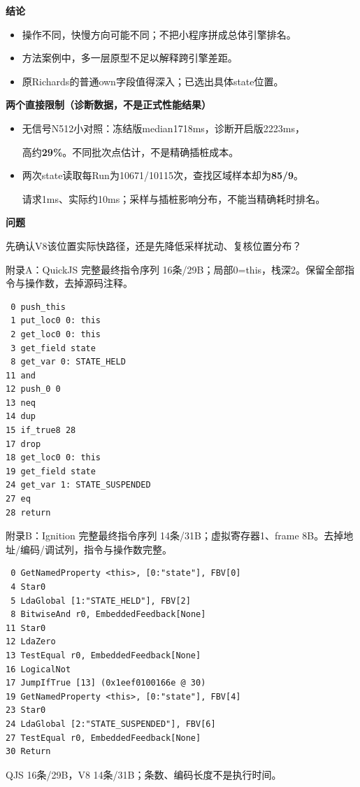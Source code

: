 \documentclass[UTF8,aspectratio=169,10pt,fontset=fandol]{ctexbeamer}
\newcommand{\DiagNote}{诊断数据，不作正式性能结果。}
\newcommand{\PageSource}{}
\newcommand{\PageMode}{}
\newcommand{\PageMeta}[2]{\gdef\PageSource{#1}\gdef\PageMode{#2}}
\begin{document}
\PageMeta{S1/S2正式汇总；S3 perturbation.json、site\_samples.csv、N1计数。}{\DiagNote}
\begin{frame}[t]{}
\small
\textbf{结论}
\begin{itemize}
  \setlength{\itemsep}{2pt}
  \item 操作不同，快慢方向可能不同；不把小程序拼成总体引擎排名。
  \item 方法案例中，多一层原型不足以解释跨引擎差距。
  \item 原Richards的普通own字段值得深入；已选出具体state位置。
\end{itemize}
\smallskip
\textbf{两个直接限制（诊断数据，不是正式性能结果）}
\begin{itemize}
  \setlength{\itemsep}{3pt}
  \item 无信号N512小对照：冻结版median1718ms，诊断开启版2223ms，\par
        高约\textbf{29\%}。不同批次点估计，不是精确插桩成本。
  \item 两次state读取每Run为10671/10115次，查找区域样本却为\textbf{85/9}。\par
        请求1ms、实际约10ms；采样与插桩影响分布，不能当精确耗时排名。
\end{itemize}
\smallskip
\textbf{问题}\par
先确认V8该位置实际快路径，还是先降低采样扰动、复核位置分布？
\end{frame}

\appendix
\PageMeta{S3：QuickJS完整目标函数dump与decoded.json；见notes.md。}{\DiagNote}
\begin{frame}[fragile,t]{附录A：QuickJS 完整最终指令序列}
\small 16条/29B；局部0=this，栈深2。保留全部指令与操作数，去掉源码注释。
\begin{lstlisting}
 0 push_this
 1 put_loc0 0: this
 2 get_loc0 0: this
 3 get_field state
 8 get_var 0: STATE_HELD
11 and
12 push_0 0
13 neq
14 dup
15 if_true8 28
17 drop
18 get_loc0 0: this
19 get_field state
24 get_var 1: STATE_SUSPENDED
27 eq
28 return
\end{lstlisting}
\end{frame}

\PageMeta{S3：同进程V8完整目标函数dump；IC地址映射见notes.md。}{\DiagNote}
\begin{frame}[fragile,t]{附录B：Ignition 完整最终指令序列}
\small 14条/31B；虚拟寄存器1、frame 8B。去掉地址/编码/调试列，指令与操作数完整。
\begin{lstlisting}
 0 GetNamedProperty <this>, [0:"state"], FBV[0]
 4 Star0
 5 LdaGlobal [1:"STATE_HELD"], FBV[2]
 8 BitwiseAnd r0, EmbeddedFeedback[None]
11 Star0
12 LdaZero
13 TestEqual r0, EmbeddedFeedback[None]
16 LogicalNot
17 JumpIfTrue [13] (0x1eef0100166e @ 30)
19 GetNamedProperty <this>, [0:"state"], FBV[4]
23 Star0
24 LdaGlobal [2:"STATE_SUSPENDED"], FBV[6]
27 TestEqual r0, EmbeddedFeedback[None]
30 Return
\end{lstlisting}
\small QJS 16条/29B，V8 14条/31B；条数、编码长度不是执行时间。
\end{frame}
\end{document}
